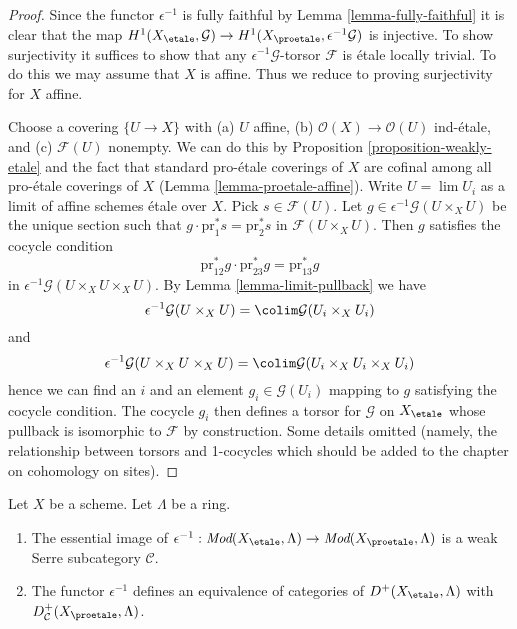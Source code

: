 \begin{proof}
Since the functor $\epsilon^{-1}$ is fully faithful by
Lemma \ref{lemma-fully-faithful}
it is clear that the map
$H^1(X_\etale, \mathcal{G}) \to H^1(X_\proetale, \epsilon^{-1}\mathcal{G})$
is injective. To show surjectivity it suffices to show that
any $\epsilon^{-1}\mathcal{G}$-torsor $\mathcal{F}$ is \'etale
locally trivial. To do this we may assume that $X$ is affine.
Thus we reduce to proving surjectivity for $X$ affine.

\medskip\noindent
Choose a covering $\{U \to X\}$ with (a) $U$ affine, (b)
$\mathcal{O}(X) \to \mathcal{O}(U)$ ind-\'etale, and (c) $\mathcal{F}(U)$
nonempty. We can do this by Proposition \ref{proposition-weakly-etale}
and the fact that
standard pro-\'etale coverings of $X$ are cofinal among all pro-\'etale
coverings of $X$ (Lemma \ref{lemma-proetale-affine}).
Write $U = \lim U_i$ as a limit of affine schemes \'etale over $X$.
Pick $s \in \mathcal{F}(U)$. Let
$g \in \epsilon^{-1}\mathcal{G}(U \times_X U)$
be the unique section such that $g \cdot \text{pr}_1^*s = \text{pr}_2^*s$ in
$\mathcal{F}(U \times_X U)$. Then $g$ satisfies the cocycle condition
$$
\text{pr}_{12}^*g \cdot \text{pr}_{23}^*g = \text{pr}_{13}^*g
$$
in $\epsilon^{-1}\mathcal{G}(U \times_X U \times_X U)$. By
Lemma \ref{lemma-limit-pullback}
we have
$$
\epsilon^{-1}\mathcal{G}(U \times_X U) =
\colim \mathcal{G}(U_i \times_X U_i)
$$
and
$$
\epsilon^{-1}\mathcal{G}(U \times_X U \times_X U) =
\colim \mathcal{G}(U_i \times_X U_i \times_X U_i)
$$
hence we can find an $i$ and an element $g_i \in \mathcal{G}(U_i)$
mapping to $g$ satisfying the cocycle condition.
The cocycle $g_i$ then defines a torsor for $\mathcal{G}$ on
$X_\etale$ whose pullback is isomorphic to $\mathcal{F}$
by construction. Some details omitted (namely, the relationship
between torsors and 1-cocycles which should be added to the chapter
on cohomology on sites).
\end{proof}

\begin{lemma}
\label{lemma-compare-derived}
Let $X$ be a scheme. Let $\Lambda$ be a ring.
\begin{enumerate}
\item The essential image of
$\epsilon^{-1} : \textit{Mod}(X_\etale, \Lambda) \to
\textit{Mod}(X_\proetale, \Lambda)$
is a weak Serre subcategory $\mathcal{C}$.
\item The functor $\epsilon^{-1}$ defines an equivalence of categories
of $D^+(X_\etale, \Lambda)$ with $D^+_\mathcal{C}(X_\proetale, \Lambda)$.
\end{enumerate}
\end{lemma}

